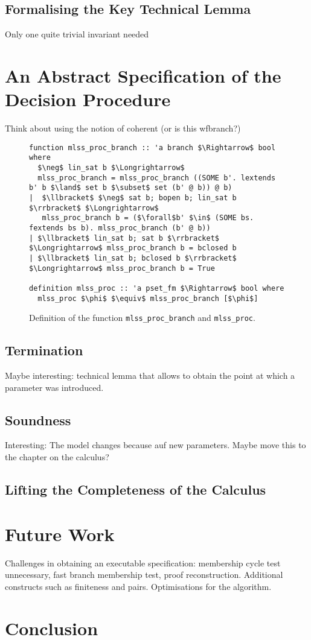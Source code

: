 \documentclass[sigplan,10pt,anonymous,review]{acmart}
\begin{document}
\subsection{Formalising the Key Technical Lemma}
Only one quite trivial invariant needed 

\section{An Abstract Specification of the Decision Procedure}
Think about using the notion of coherent (or is this wfbranch?)
\begin{figure*}
  \centering
\begin{lstlisting}
function mlss_proc_branch :: 'a branch $\Rightarrow$ bool where
  $\neg$ lin_sat b $\Longrightarrow$
  mlss_proc_branch = mlss_proc_branch ((SOME b'. lextends b' b $\land$ set b $\subset$ set (b' @ b)) @ b)
|  $\llbracket$ $\neg$ sat b; bopen b; lin_sat b $\rrbracket$ $\Longrightarrow$
   mlss_proc_branch b = ($\forall$b' $\in$ (SOME bs. fextends bs b). mlss_proc_branch (b' @ b))
| $\llbracket$ lin_sat b; sat b $\rrbracket$ $\Longrightarrow$ mlss_proc_branch b = bclosed b
| $\llbracket$ lin_sat b; bclosed b $\rrbracket$ $\Longrightarrow$ mlss_proc_branch b = True

definition mlss_proc :: 'a pset_fm $\Rightarrow$ bool where
  mlss_proc $\phi$ $\equiv$ mlss_proc_branch [$\phi$]
\end{lstlisting}
\caption{Definition of the function \lstinline|mlss_proc_branch| and \lstinline|mlss_proc|.}
\end{figure*}

\subsection{Termination}
Maybe interesting: technical lemma that allows to obtain the point at which a parameter was introduced.
\subsection{Soundness}
Interesting: The model changes because auf new parameters.
Maybe move this to the chapter on the calculus?
\subsection{Lifting the Completeness of the Calculus}

\section{Future Work}
Challenges in obtaining an executable specification: membership cycle test unnecessary, fast branch membership test, proof reconstruction.
Additional constructs such as finiteness and pairs.
Optimisations for the algorithm.

\section{Conclusion}

\begin{acks}
\end{acks}



\end{document}
